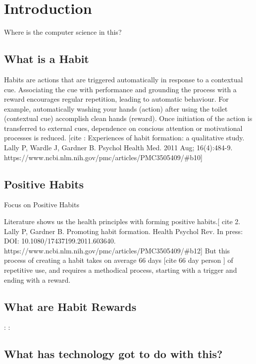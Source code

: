 
\section{Introduction}

Where is the computer science in this?

\subsection*{What is a Habit}

Habits are actions that are triggered automatically in response to a contextual cue. Associating the cue with performance and grounding the process with a reward encourages regular repetition, leading to automatic behaviour. For example, automatically washing your hands (action) after using the toilet (contextual cue) accomplish clean hands (reward). Once initiation of the action is transferred to external cues, dependence on concious attention or motivational processes is reduced. [cite : Experiences of habit formation: a qualitative study. Lally P, Wardle J, Gardner B. Psychol Health Med. 2011 Aug; 16(4):484-9. https://www.ncbi.nlm.nih.gov/pmc/articles/PMC3505409/#b10]

\subsection*{Positive Habits}

Focus on Positive Habits

Literature shows us the health principles with forming positive habits.[ cite 2. Lally P, Gardner B. Promoting habit formation. Health Psychol Rev. In press: DOI: 10.1080/17437199.2011.603640. https://www.ncbi.nlm.nih.gov/pmc/articles/PMC3505409/#b12] But this process of creating a habit takes on average 66 days [cite 66 day person ] of repetitive use, and requires a methodical process, starting with a trigger and ending with a reward.

\subsection*{What are Habit Rewards}

:\newline
:

\subsection*{What has technology got to do with this?}

